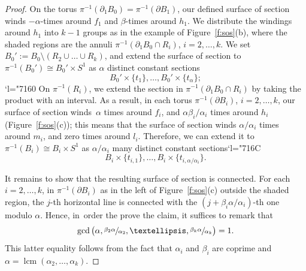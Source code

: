 \documentclass[11pt]{article}
\numberwithin{equation}{section}
\newcommand{\Changel}{\mathcode`l="7160}
\newcommand{\Changelback}{\mathcode`l="716C}
\theoremstyle{definition}
\DeclareMathOperator{\lcm}{lcm}
\begin{document}
\begin{proof}
On the torus $\pi^{-1}(\partial_1 B_0)=\pi^{-1}(\partial B_1)$, our defined surface of section winds $- \alpha$\nobreakdash-times around $f_1$ and $ \beta$-times around $h_1$. We distribute the windings around $h_1$ into $k-1$ groups as in the example of Figure~\ref{f:sos}(b), where the shaded regions are the annuli $\pi^{-1}(\partial_1 B_0 \cap R_i)$, $i=2,\dots,k$. We set $B_0':=B_0\setminus (R_2\cup\dots\cup R_k)$, and extend the surface of section to $\pi^{-1}(B_0')\cong B_0'\times S^1$ as $\alpha$ distinct constant sections
\[
B_0'\times\{t_1\},\dots, B_0'\times\{t_{\alpha}\};
\]
\Changel
On $\pi^{-1}(R_i)$, we extend the section in $\pi^{-1}(\partial_1 B_0 \cap R_i)$ by taking the product with an interval. As a result, in each torus $\pi^{-1}(\partial B_i)$, $i=2,\dots,k$, our surface of section winds~$\alpha$ times around $f_i$, and $\alpha\beta_i/\alpha_i$ times around $h_i$ (Figure~\ref{f:sos}(c)); this means that the surface of section winds $\alpha/\alpha_i$ times around $m_i$, and zero times around $l_i$. Therefore, we can extend it to $\pi^{-1}(B_i)\cong B_i\times S^1$ as $\alpha/\alpha_i$ many distinct constant sections\Changelback
\[
B_i\times\{t_{i,1}\},\dots,B_i\times\{t_{i,\alpha/\alpha_i}\}.
\]

It remains to show that the resulting surface of section is connected. For each $i=2,\dots,k$, in $\pi^{-1}(\partial B_i)$ as in the left of Figure~\ref{f:sos}(c) outside the shaded region, the $j$-th horizontal line is connected with the $(j+ \beta_i\alpha/\alpha_i)$-th one modulo $\alpha$. Hence, in~order the prove the claim, it suffices to remark that
\[
\gcd\big( \alpha, \sfrac{\beta_2 \alpha}{\alpha_2},\dots, \sfrac{\beta_k \alpha}{\alpha_k}\big) = 1.
\]
This latter equality follows from the fact that $\alpha_i$ and $\beta_i$ are coprime and $ \alpha=\lcm(\alpha_2,\dots,\alpha_k)$.
\end{proof}
\end{document}
